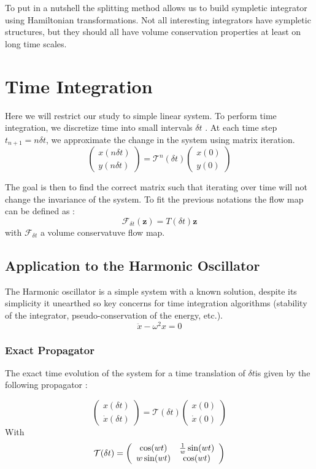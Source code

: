 \documentclass[ansiapaper]{report}
\begin{document}
\begin{multicols}{3}
	To put in a nutshell the splitting method allows us to build sympletic integrator using Hamiltonian transformations. Not all interesting integrators have sympletic structures, but they should all have volume conservation properties at least on long time scales.
	\section{Time Integration}

	Here we will restrict our study to simple linear system. To perform time integration, we discretize time into small intervals $\delta t$ . At each time step $t_{n+1}=n \delta t$, we approximate the change in the system using matrix iteration.
	$$ \begin{pmatrix}
			x(n\delta t) \\
			y(n\delta t)
		\end{pmatrix} = \mathcal{T}^n(\delta t) \begin{pmatrix}
			x(0) \\
			y(0)
		\end{pmatrix}$$

	The goal is then to find the correct matrix such that iterating over time will not change the invariance of the system. To fit the previous notations the flow map can be defined as :
	$$\mathcal{F}_{\delta t}(\textbf{z} ) = T(\delta t)\textbf{z} $$ with $\mathcal{F}_{\delta t}$ a volume conservatuve flow map.

	\subsection{Application to the Harmonic Oscillator}
    The Harmonic oscillator is a simple system with a known solution, despite its simplicity it unearthed so key concerns for time integration algorithms (stability of the integrator, pseudo-conservation of the energy, etc.).
	$$\ddot{x} - \omega^2 x = 0$$
	\subsubsection{Exact Propagator}
    The exact time evolution of the system for a time translation of $\delta t$is given by the following propagator : 

	$$ \begin{pmatrix}
			x(\delta t) \\
			\dot{x}(\delta  t)
		\end{pmatrix} = \mathcal{T}(\delta t) \begin{pmatrix}
			x(0) \\
			\dot{x}(0)
		\end{pmatrix}$$
	With $$\mathcal{T}(\delta t) =  \left(\begin{array}{cc}
				\cos(wt)    & \frac{1}{w}\sin(wt) \\
				\-w\sin(wt) & \cos(wt)
			\end{array}\right)$$


\end{multicols}
\end{document}
